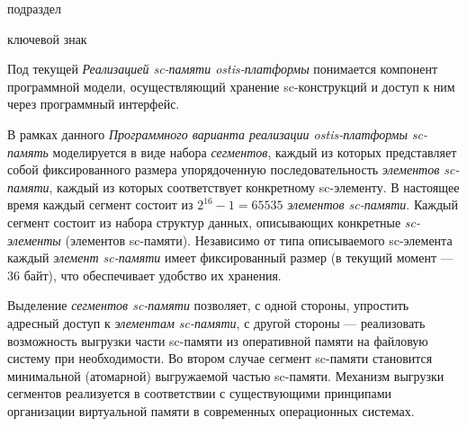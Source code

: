 \begin{SCn}

\begin{scnrelfromlist}{подраздел}
\end{scnrelfromlist}

\begin{scnrelfromlist}{ключевой знак}
	\begin{scnindent}
	\end{scnindent}
\end{scnrelfromlist}

\end{SCn}

\bigskip

Под текущей \textit{Реализацией sc-памяти ostis-платформы} понимается компонент программной модели, осуществляющий хранение sc-конструкций и доступ к ним через программный интерфейс.

В рамках данного \textit{Программного варианта реализации ostis-платформы} \textit{sc-память} моделируется в виде набора \textit{сегментов}, каждый из которых представляет собой фиксированного размера упорядоченную последовательность \textit{элементов sc-памяти}, каждый из которых соответствует конкретному sc-элементу. В настоящее время каждый сегмент состоит из $2^{16}-1=65535$ \textit{элементов sc-памяти}. Каждый сегмент состоит из набора структур данных, описывающих конкретные \textit{sc-элементы} (элементов sc-памяти). Независимо от типа описываемого sc-элемента каждый \textit{элемент sc-памяти} имеет фиксированный размер (в текущий момент --- 36 байт), что обеспечивает удобство их хранения.

Выделение \textit{сегментов sc-памяти} позволяет, с одной стороны, упростить адресный доступ к \textit{элементам sc-памяти}, с другой стороны --- реализовать возможность выгрузки части sc-памяти из оперативной памяти на файловую систему при необходимости. Во втором случае сегмент sc-памяти становится минимальной (атомарной) выгружаемой частью sc-памяти. Механизм выгрузки сегментов реализуется в соответствии с существующими принципами организации виртуальной памяти в современных операционных системах.

